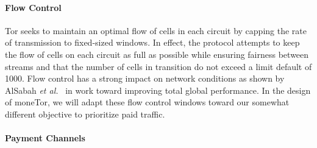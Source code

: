 \paragraph*{Flow Control} Tor seeks to maintain an optimal flow of cells in
each circuit by capping the rate of transmission to fixed-sized windows.
In effect, the protocol attempts to keep the flow of cells on each circuit as
full as possible while ensuring fairness between streams and that the number of
cells in transition do not exceed a limit default of 1000. Flow control has a
strong impact on network conditions as shown by AlSabah \textit{et
  al.}~\cite{pets2011-defenestrator} in work toward improving total global
performance. In the design of moneTor, we will adapt these flow control windows
toward our somewhat different objective to prioritize paid traffic.

\paragraph*{Payment Channels}

%

